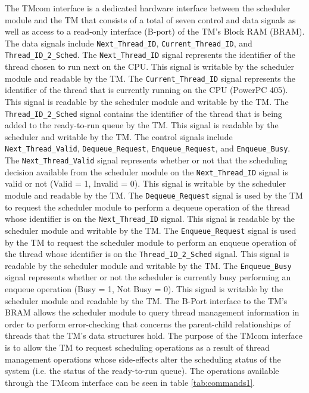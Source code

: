 The TMcom interface is a dedicated hardware interface between the scheduler
module and the TM that consists of a total of seven control and data signals as
well as access to a read-only interface (B-port) of the TM's Block RAM (BRAM).
The data signals include \texttt{Next\_Thread\_ID},
\texttt{Current\_Thread\_ID}, and \texttt{Thread\_ID\_2\_Sched}.  The
\texttt{Next\_Thread\_ID} signal represents the identifier of the thread chosen
to run next on the CPU.  This signal is writable by the scheduler module and
readable by the TM.  The \texttt{Current\_Thread\_ID} signal represents the
identifier of the thread that is currently running on the CPU (PowerPC 405).
This signal is readable by the scheduler module and writable by the TM.  The
\texttt{Thread\_ID\_2\_Sched} signal contains the identifier of the thread that
is being added to the ready-to-run queue by the TM.  This signal is readable by
the scheduler and writable by the TM.  The control signals include
\texttt{Next\_Thread\_Valid}, \texttt{Dequeue\_Request},
\texttt{Enqueue\_Request}, and \texttt{Enqueue\_Busy}.  The
\texttt{Next\_Thread\_Valid} signal represents whether or not that the
scheduling decision available from the scheduler module on the
\texttt{Next\_Thread\_ID} signal is valid or not (Valid = 1, Invalid = 0).
This signal is writable by the scheduler module and readable by the TM.  The
\texttt{Dequeue\_Request} signal is used by the TM to request the scheduler
module to perform a dequeue operation of the thread whose identifier is on the
\texttt{Next\_Thread\_ID} signal.  This signal is readable by the scheduler
module and writable by the TM.  The \texttt{Enqueue\_Request} signal is used by
the TM to request the scheduler module to perform an enqueue operation of the
thread whose identifier is on the \texttt{Thread\_ID\_2\_Sched} signal.  This
signal is readable by the scheduler module and writable by the TM.  The
\texttt{Enqueue\_Busy} signal represents whether or not the scheduler is
currently busy performing an enqueue operation (Busy = 1, Not Busy = 0).  This
signal is writable by the scheduler module and readable by the TM.  The B-Port
interface to the TM's BRAM allows the scheduler module to query thread
management information in order to perform error-checking that concerns the
parent-child relationships of threads that the TM's data structures hold.  The
purpose of the TMcom interface is to allow the TM to request scheduling
operations as a result of thread management operations whose side-effects alter
the scheduling status of the system (i.e. the status of the ready-to-run
queue).  The operations available through the TMcom interface can be seen in table
\ref{tab:commands1}.

